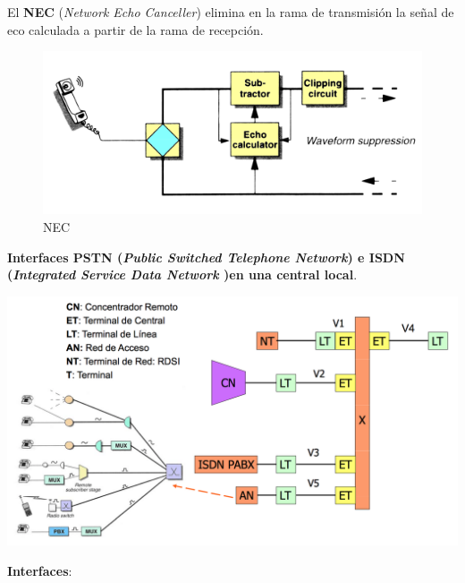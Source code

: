 \documentclass[10pt,portrait, twocolumn]{article}
\begin{document}
El \textbf{NEC} (\textit{Network Echo Canceller}) elimina en la rama de transmisión la señal de eco calculada a partir de la rama de recepción.


	\begin{figure}[!ht]
 		\centering
  		 \includegraphics[scale = 0.25]{images/NEC}
		\caption{NEC}
	\end{figure}

\textbf{Interfaces PSTN (\textit{Public Switched Telephone Network}) e ISDN (\textit{Integrated Service Data Network })en una central local}.

	\begin{center}
		\includegraphics[scale=0.35]{images/ISDN}
	\end{center}

\textbf{Interfaces}:
\end{document}
